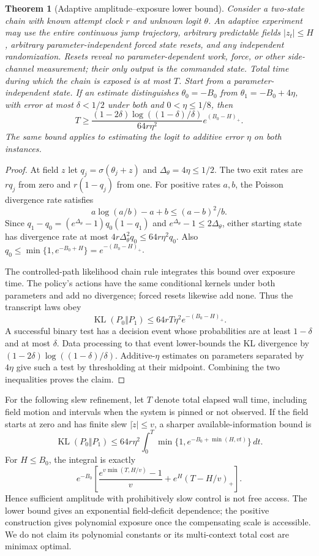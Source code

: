 \documentclass[11pt]{article}
\newtheorem{theorem}{Theorem}
\newcommand{\KL}{\operatorname{KL}}
\newcommand{\sig}{\sigma}
\begin{document}
\begin{theorem}[Adaptive amplitude--exposure lower bound]
Consider a two-state chain with known attempt clock $r$ and unknown logit $\theta$. An adaptive experiment may use the entire continuous jump trajectory, arbitrary predictable fields $|z_t|\le H$, arbitrary parameter-independent forced state resets, and any independent randomization. Resets reveal no parameter-dependent work, force, or other side-channel measurement; their only output is the commanded state. Total time during which the chain is exposed is at most $T$. Start from a parameter-independent state. If an estimate distinguishes $\theta_0=-B_0$ from $\theta_1=-B_0+4\eta$, with error at most $\delta<1/2$ under both and $0<\eta\le1/8$, then
\begin{equation}
 T\ge\frac{(1-2\delta)\log((1-\delta)/\delta)}{64r\eta^2}
 e^{(B_0-H)_+}.
 \label{eq:lower}
\end{equation}
The same bound applies to estimating the logit to additive error $\eta$ on both instances.
\end{theorem}
\begin{proof}
At field $z$ let $q_j=\sig(\theta_j+z)$ and $\Delta_\theta=4\eta\le1/2$. The two exit rates are $rq_j$ from zero and $r(1-q_j)$ from one. For positive rates $a,b$, the Poisson divergence rate satisfies
\[
 a\log(a/b)-a+b\le(a-b)^2/b.
\]
Since $q_1-q_0=(e^{\Delta_\theta}-1)q_0(1-q_1)$ and $e^{\Delta_\theta}-1\le2\Delta_\theta$, either starting state has divergence rate at most $4r\Delta_\theta^2q_0\le64r\eta^2q_0$. Also $q_0\le\min\{1,e^{-B_0+H}\}=e^{-(B_0-H)_+}$.

The controlled-path likelihood chain rule integrates this bound over exposure time. The policy's actions have the same conditional kernels under both parameters and add no divergence; forced resets likewise add none. Thus the transcript laws obey
\[
 \KL(P_0\Vert P_1)\le64rT\eta^2 e^{-(B_0-H)_+}.
\]
A successful binary test has a decision event whose probabilities are at least $1-\delta$ and at most $\delta$. Data processing to that event lower-bounds the KL divergence by $(1-2\delta)\log((1-\delta)/\delta)$. Additive-$\eta$ estimates on parameters separated by $4\eta$ give such a test by thresholding at their midpoint. Combining the two inequalities proves the claim.
\end{proof}

For the following slew refinement, let $T$ denote total elapsed wall time, including field motion and intervals when the system is pinned or not observed. If the field starts at zero and has finite slew $|\dot z|\le v$, a sharper available-information bound is
\begin{equation}
 \KL(P_0\Vert P_1)\le64r\eta^2\int_0^T
 \min\{1,e^{-B_0+\min(H,vt)}\}\,dt.
 \label{eq:slew}
\end{equation}
For $H\le B_0$, the integral is exactly
\[
 e^{-B_0}\left[\frac{e^{v\min(T,H/v)}-1}{v}+e^H(T-H/v)_+\right].
\]
Hence sufficient amplitude with prohibitively slow control is not free access. The lower bound gives an exponential field-deficit dependence; the positive construction gives polynomial exposure once the compensating scale is accessible. We do not claim its polynomial constants or its multi-context total cost are minimax optimal.
\end{document}
